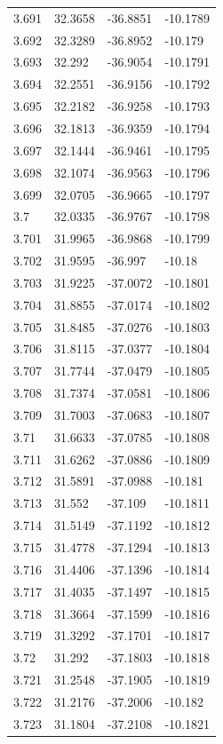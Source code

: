 \begin{tabular}{llll}
3.691 & 32.3658 & -36.8851 & -10.1789 \\
3.692 & 32.3289 & -36.8952 & -10.179 \\
3.693 & 32.292 & -36.9054 & -10.1791 \\
3.694 & 32.2551 & -36.9156 & -10.1792 \\
3.695 & 32.2182 & -36.9258 & -10.1793 \\
3.696 & 32.1813 & -36.9359 & -10.1794 \\
3.697 & 32.1444 & -36.9461 & -10.1795 \\
3.698 & 32.1074 & -36.9563 & -10.1796 \\
3.699 & 32.0705 & -36.9665 & -10.1797 \\
3.7 & 32.0335 & -36.9767 & -10.1798 \\
3.701 & 31.9965 & -36.9868 & -10.1799 \\
3.702 & 31.9595 & -36.997 & -10.18 \\
3.703 & 31.9225 & -37.0072 & -10.1801 \\
3.704 & 31.8855 & -37.0174 & -10.1802 \\
3.705 & 31.8485 & -37.0276 & -10.1803 \\
3.706 & 31.8115 & -37.0377 & -10.1804 \\
3.707 & 31.7744 & -37.0479 & -10.1805 \\
3.708 & 31.7374 & -37.0581 & -10.1806 \\
3.709 & 31.7003 & -37.0683 & -10.1807 \\
3.71 & 31.6633 & -37.0785 & -10.1808 \\
3.711 & 31.6262 & -37.0886 & -10.1809 \\
3.712 & 31.5891 & -37.0988 & -10.181 \\
3.713 & 31.552 & -37.109 & -10.1811 \\
3.714 & 31.5149 & -37.1192 & -10.1812 \\
3.715 & 31.4778 & -37.1294 & -10.1813 \\
3.716 & 31.4406 & -37.1396 & -10.1814 \\
3.717 & 31.4035 & -37.1497 & -10.1815 \\
3.718 & 31.3664 & -37.1599 & -10.1816 \\
3.719 & 31.3292 & -37.1701 & -10.1817 \\
3.72 & 31.292 & -37.1803 & -10.1818 \\
3.721 & 31.2548 & -37.1905 & -10.1819 \\
3.722 & 31.2176 & -37.2006 & -10.182 \\
3.723 & 31.1804 & -37.2108 & -10.1821 \\

\end{tabular}
